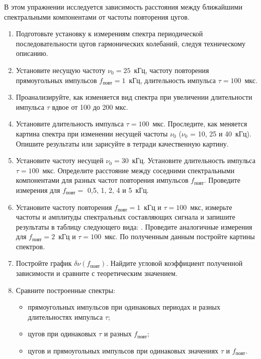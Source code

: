 \begin{lab:task}

В этом упражнении исследуется зависимость расстояния между ближайшими спектральными компонентами от частоты повторения цугов.

\begin{enumerate}
	\item Подготовьте установку к измерениям спектра периодической последовательности цугов гармонических колебаний, следуя техническому описанию.
	\item Установите несущую частоту $\nu_0 = 25$~кГц, частоту повторения прямоугольных импульсов $f_\text{повт} = 1$~кГц, длительность импульса $\tau = 100$~мкс.
	\item Проанализируйте, как изменяется вид спектра при увеличении длительности импульса $\tau$ вдвое от 100 до 200 мкс.
	\item Установите длительность импульса $\tau= 100$~мкс. Проследите, как меняется картина спектра при изменении несущей частоты $\nu_0$ ($\nu_0$ = 10, 25 и 40~кГц). Опишите результаты или зарисуйте в тетради качественную картину.
	\item Установите частоту несущей $\nu_0 = 30$~кГц. Установите длительность импульса $\tau = 100$~мкс. Определите расстояние  между соседними спектральными компонентами для разных частот повторения импульсов $f_\text{повт}$. Проведите измерения для $f_\text{повт} =$ 0,5, 1, 2, 4 и 5~кГц.
	\item Установите частоту повторения $f_\text{повт} = 1$~кГц и $\tau = 100$~мкс, измерьте частоты и амплитуды спектральных составляющих сигнала и запишите результаты в таблицу следующего вида: . Проведите аналогичные измерения для $f_\text{повт} = 2$~кГц и $\tau = 100$~мкс. По полученным данным постройте картины спектров.
	\item Постройте график $\delta \nu(f_\text{повт})$. Найдите угловой коэффициент полученной зависимости и сравните с теоретическим значением.
	\item Сравните построенные спектры:
	\begin{itemize}
		\item прямоугольных импульсов при одинаковых периодах и разных длительностях импульса $\tau$;
		\item цугов при одинаковых $\tau$ и разных $f_\text{повт}$;
		\item цугов и прямоугольных импульсов при одинаковых значениях $\tau$ и  $f_\text{повт}$.
	\end{itemize}
\end{enumerate}


\end{lab:task}
